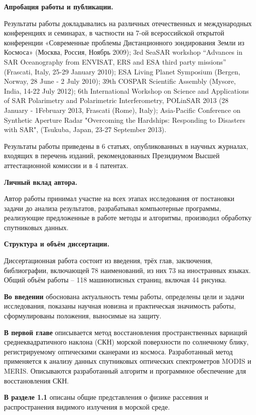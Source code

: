 \textbf{Апробация работы и публикации.}

Результаты работы докладывались на различных отечественных и международных конференциях и семинарах, в частности на 7-ой всероссийской открытой конференции «Современные проблемы Дистанционного зондирования Земли из Космоса» (Москва, Россия, Ноябрь 2009); 3rd SeaSAR workshop “Advances in SAR Oceanography from ENVISAT, ERS and ESA third party missions” (Frascati, Italy, 25-29 January 2010); ESA Living Planet Symposium (Bergen, Norway, 28 June - 2 July 2010); 39th COSPAR Scientific Assembly (Mysore, India, 14-22 July 2012); 6th International Workshop on Science and Applications of SAR Polarimetry and Polarimetric Interferometry, POLinSAR 2013 (28 January - 1February 2013, Frascati (Rome), Italy); Asia-Pacific Conference on Synthetic Aperture Radar "Overcoming the Hardships: Responding to Disasters with SAR", (Tsukuba, Japan, 23-27 September 2013).

Результаты работы приведены в 6 статьях, опубликованных в научных журналах, входящих в перечень изданий, рекомендованных Президиумом Высшей аттестационной комиссии и в 4 патентах.

\textbf{Личный вклад автора.}

Автор работы принимал участие на всех этапах исследования от постановки задачи до анализа результатов, разрабатывал компьютерные программы, реализующие предложенные в работе методы и алгоритмы, производил обработку спутниковых данных. 

\textbf{Структура и объём диссертации.}

Диссертационная работа состоит из введения, трёх глав, заключения, библиографии, включающей 78 наименований, из них 73 на иностранных языках. Общий объём работы -- 118 машинописных страниц, включая 44 рисунка.

\textbf{Во введении} обоснована актуальность темы работы, определены цели и задачи исследования, показаны научная новизна и практическая значимость работы, сформулированы положения, выносимые на защиту.

\textbf{В первой главе} описывается метод восстановления пространственных вариаций среднеквадратичного наклона (СКН) морской поверхности по солнечному блику, регистрируемому оптическими сканерами из космоса. Разработанный метод применяется к анализу данных спутниковых оптических спектрометров MODIS и MERIS. Описываются разработанный алгоритм и программное обеспечение для восстановления СКН.

\textbf{В разделе 1.1} описаны общие представления о физике рассеяния и распространения видимого излучения в морской среде.

